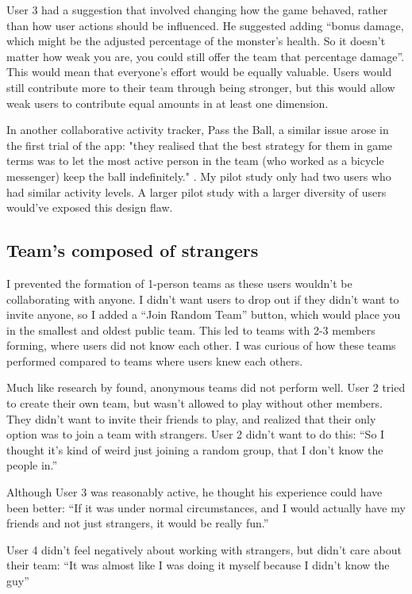 \documentclass{l4proj}
\begin{document}
User 3 had a suggestion that involved changing how the game behaved, rather than how user actions should be influenced. He suggested adding ``bonus damage, which might be the adjusted percentage of the monster's health. So it doesn't matter how weak you are, you could still offer the team that percentage damage''. This would mean that everyone's effort would be equally valuable. Users would still contribute more to their team through being stronger, but this would allow weak users to contribute equal amounts in at least one dimension. 

In another collaborative activity tracker, Pass the Ball, a similar issue arose in the first trial of the app: "they realised that the best strategy for them in game terms was to let the most active person in the team (who worked as a bicycle messenger) keep the ball indefinitely." \citep{Pass_the_ball}. My pilot study only had two users who had similar activity levels. A larger pilot study with a larger diversity of users would've exposed this design flaw.

\subsection{Team's composed of strangers}
I prevented the formation of 1-person teams as these users wouldn't be collaborating with anyone. I didn't want users to drop out if they didn't want to invite anyone, so I added a ``Join Random Team'' button, which would place you in the smallest and oldest public team. This led to teams with 2-3 members forming, where users did not know each other. I was curious of how these teams performed compared to teams where users knew each others.

Much like research by \citet{Fish'n'Steps} found, anonymous teams did not perform well. User 2 tried to create their own team, but wasn't allowed to play without other members. They didn't want to invite their friends to play, and realized that their only option was to join a team with strangers. User 2 didn't want to do this: ``So I thought it's kind of weird just joining a random group, that I don't know the people in.'' 

Although User 3 was reasonably active, he thought his experience could have been better: ``If it was under normal circumstances, and I would actually have my friends and not just strangers, it would be really fun.'' 

User 4 didn't feel negatively about working with strangers, but didn't care about their team: ``It was almost like I was doing it myself because I didn't know the guy'' 
\end{document}
